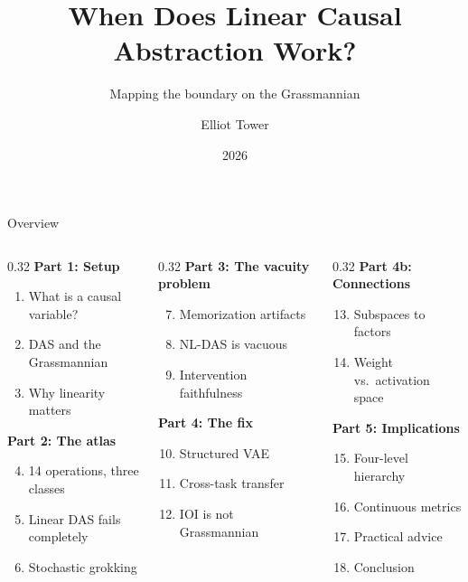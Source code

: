 \documentclass[aspectratio=169,11pt]{beamer}
\title{When Does Linear Causal Abstraction Work?}
\subtitle{Mapping the boundary on the Grassmannian}
\author{Elliot Tower}
\date{2026}
\institute{}
\begin{document}
\maketitle

\begin{frame}{Overview}
\begin{columns}[T]
\begin{column}{0.32\textwidth}
\textbf{Part 1: Setup}
\begin{enumerate}
  \item What is a causal variable?
  \item DAS and the Grassmannian
  \item Why linearity matters
\end{enumerate}
\vspace{0.5em}
\textbf{Part 2: The atlas}
\begin{enumerate}
  \setcounter{enumi}{3}
  \item 14 operations, three classes
  \item Linear DAS fails completely
  \item Stochastic grokking
\end{enumerate}
\end{column}
\begin{column}{0.32\textwidth}
\textbf{Part 3: The vacuity problem}
\begin{enumerate}
  \setcounter{enumi}{6}
  \item Memorization artifacts
  \item NL-DAS is vacuous
  \item Intervention faithfulness
\end{enumerate}
\vspace{0.5em}
\textbf{Part 4: The fix}
\begin{enumerate}
  \setcounter{enumi}{9}
  \item Structured VAE
  \item Cross-task transfer
  \item IOI is not Grassmannian
\end{enumerate}
\end{column}
\begin{column}{0.32\textwidth}
\textbf{Part 4b: Connections}
\begin{enumerate}
  \setcounter{enumi}{12}
  \item Subspaces to factors
  \item Weight vs.\ activation space
\end{enumerate}
\vfill
\textbf{Part 5: Implications}
\begin{enumerate}
  \setcounter{enumi}{14}
  \item Four-level hierarchy
  \item Continuous metrics
  \item Practical advice
  \item Conclusion
\end{enumerate}
\end{column}
\end{columns}
\end{frame}
\end{document}
